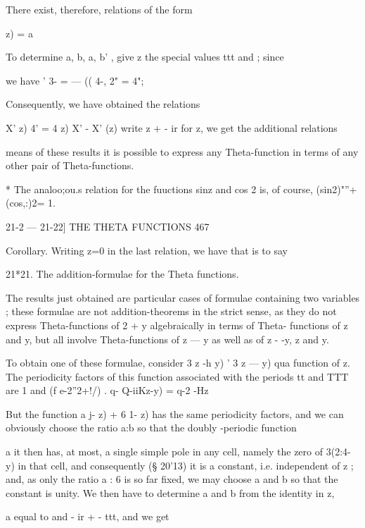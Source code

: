 There exist, therefore, relations of the form

     z) = a%

To determine a, b, a, b' , give z the special values ttt and ; since

we have ' 3- = — (( 4-, 2" = 4"; %

Consequently, we have obtained the relations

X' z) 4' = 4 z) X' - X' (z) %
write z + - ir for z, we get the additional relations

means of these results it is possible to express any Theta-function in
terms of any other pair of Theta-functions.

* The analoo;ou.s relation for the fuuctions sinz and cos 2 is, of
course, (sin2)"''+(cos,:)2= 1.

21-2 — 21-22] THE THETA FUNCTIONS 467

Corollary. Writing z=0 in the last relation, we have that is to say

21*21. The addition-formulae for the Theta functions.

The results just obtained are particular cases of formulae containing
two variables ; these formulae are not addition-theorems in the strict
sense, as they do not express Theta-functions of 2 + y algebraically
in terms of Theta- functions of z and y, but all involve
Theta-functions of z — y as well as of z - -y, z and y.

To obtain one of these formulae, consider 3 z -h y) ' 3 z — y) qua
function of z. The periodicity factors of this function associated
with the periods tt and TTT are 1 and (f e-2''2+!/) . q- Q-iiKz-y) =
q-2 -Hz

But the function a j- z) + 6 1- z) has the same periodicity factors,
and we can obviously choose the ratio a:b so that the doubly -periodic
function

a%
it then has, at most, a single simple pole in any cell, namely the
zero of 3(2:4- y) in that cell, and consequently (§ 20'13) it is a
constant, i.e. independent of z ; and, as only the ratio a : 6 is so
far fixed, we may choose a and b so that the constant is unity. We
then have to determine a and b from the identity in z,

a%
equal to and - ir + - ttt, and we get

